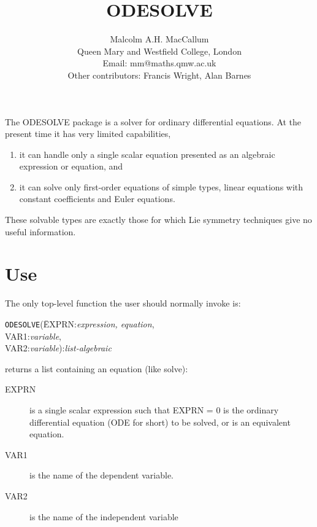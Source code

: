 \date{}
\title{ODESOLVE}
\author{Malcolm A.H. MacCallum \\ Queen Mary and Westfield College, London \\
Email: mm@maths.qmw.ac.uk \\[0.1in]
Other contributors: Francis Wright, Alan Barnes}

\maketitle

The ODESOLVE package is a solver for ordinary differential equations.
At the present time it has very limited capabilities,

\begin{enumerate}
\item it can handle only a single scalar equation presented as an
algebraic expression or equation, and
\item it can solve only first-order equations of simple types,
linear equations with constant coefficients and Euler equations.
\end{enumerate}

\noindent These solvable types are exactly those for
which Lie symmetry techniques give no useful information.

\section{Use}
The only top-level function the user should normally invoke is:

\vspace{.1in}
\begin{tabbing}
{\tt ODESOLVE}(\=EXPRN:{\em expression, equation}, \\
\>VAR1:{\em variable}, \\
\>VAR2:{\em variable}):{\em list-algebraic}
\end{tabbing}
\vspace{.1in}

 returns a list containing an equation (like solve):

\begin{description}
\item[EXPRN] is a single scalar expression such that EXPRN = 0 is the
ordinary differential equation (ODE for short) to be solved,
or is an equivalent equation.
\item[VAR1] is the name of the dependent variable.
\item[VAR2] is the name of the independent variable
\end{description}

